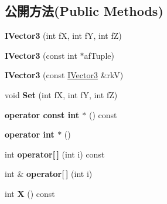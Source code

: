 \subsection*{公開方法(Public Methods)}
\begin{DoxyCompactItemize}
\item 
{\bfseries I\+Vector3} (int fX, int fY, int fZ)\hypertarget{class_magnum_1_1_i_vector3_a50bda485a1ae88e2a1a709439d7bab21}{}\label{class_magnum_1_1_i_vector3_a50bda485a1ae88e2a1a709439d7bab21}

\item 
{\bfseries I\+Vector3} (const int $\ast$af\+Tuple)\hypertarget{class_magnum_1_1_i_vector3_a586151fd5869e5405df7a33e8c3dfab1}{}\label{class_magnum_1_1_i_vector3_a586151fd5869e5405df7a33e8c3dfab1}

\item 
{\bfseries I\+Vector3} (const \hyperlink{class_magnum_1_1_i_vector3}{I\+Vector3} \&rkV)\hypertarget{class_magnum_1_1_i_vector3_a3ea636c736b94a2f1829c8e31aa053b7}{}\label{class_magnum_1_1_i_vector3_a3ea636c736b94a2f1829c8e31aa053b7}

\item 
void {\bfseries Set} (int fX, int fY, int fZ)\hypertarget{class_magnum_1_1_i_vector3_a8c8ecca8ed59ff79da4e8b036271166b}{}\label{class_magnum_1_1_i_vector3_a8c8ecca8ed59ff79da4e8b036271166b}

\item 
{\bfseries operator const int $\ast$} () const \hypertarget{class_magnum_1_1_i_vector3_a70d841021d8ff82735271a664c5b09af}{}\label{class_magnum_1_1_i_vector3_a70d841021d8ff82735271a664c5b09af}

\item 
{\bfseries operator int $\ast$} ()\hypertarget{class_magnum_1_1_i_vector3_a5d2ea45bb81e2ac814943761a1c689f2}{}\label{class_magnum_1_1_i_vector3_a5d2ea45bb81e2ac814943761a1c689f2}

\item 
int {\bfseries operator\mbox{[}$\,$\mbox{]}} (int i) const \hypertarget{class_magnum_1_1_i_vector3_a9eed80a9b55b3dd0da7914f3e75c8818}{}\label{class_magnum_1_1_i_vector3_a9eed80a9b55b3dd0da7914f3e75c8818}

\item 
int \& {\bfseries operator\mbox{[}$\,$\mbox{]}} (int i)\hypertarget{class_magnum_1_1_i_vector3_ae1ac2847553040347275d10984507db6}{}\label{class_magnum_1_1_i_vector3_ae1ac2847553040347275d10984507db6}

\item 
int {\bfseries X} () const \hypertarget{class_magnum_1_1_i_vector3_a2ee173507c5cbc0e9ef50d5106e992b6}{}\label{class_magnum_1_1_i_vector3_a2ee173507c5cbc0e9ef50d5106e992b6}


\end{DoxyCompactItemize}
